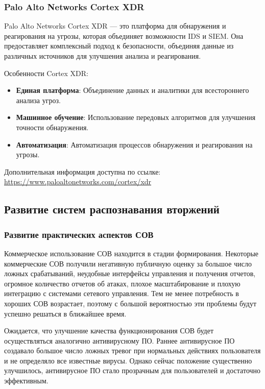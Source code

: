 \subsubsection{Palo Alto Networks Cortex XDR}

Palo Alto Networks Cortex XDR — это платформа для обнаружения и реагирования на угрозы, которая объединяет возможности IDS и SIEM. Она предоставляет комплексный подход к безопасности, объединяя данные из различных источников для улучшения анализа и реагирования.

Особенности Cortex XDR:
\begin{itemize}
    \item \textbf{Единая платформа}: Объединение данных и аналитики для всестороннего анализа угроз.
    \item \textbf{Машинное обучение}: Использование передовых алгоритмов для улучшения точности обнаружения.
    \item \textbf{Автоматизация}: Автоматизация процессов обнаружения и реагирования на угрозы.
\end{itemize}

Дополнительная информация доступна по ссылке: \url{https://www.paloaltonetworks.com/cortex/xdr}


\subsection{Развитие систем распознавания вторжений}

\subsubsection{Развитие практических аспектов СОВ}

Коммерческое использование СОВ находится в стадии формирования. Некоторые коммерческие
СОВ получили негативную публичную оценку за большое число ложных срабатываний, неудобные
интерфейсы управления и получения отчетов, огромное количество отчетов об атаках,
плохое масштабирование и плохую интеграцию с системами сетевого управления. Тем не менее
потребность в хороших СОВ возрастает, поэтому с большой вероятностью эти проблемы будут
успешно решаться в ближайшее время.

Ожидается, что улучшение качества функционирования СОВ будет осуществляться аналогично
антивирусному ПО. Раннее антивирусное ПО создавало большое число ложных тревог при
нормальных действиях пользователя и не определяло все известные вирусы. Однако сейчас
положение существенно улучшилось, антивирусное ПО стало прозрачным для пользователей
и достаточно эффективным.

